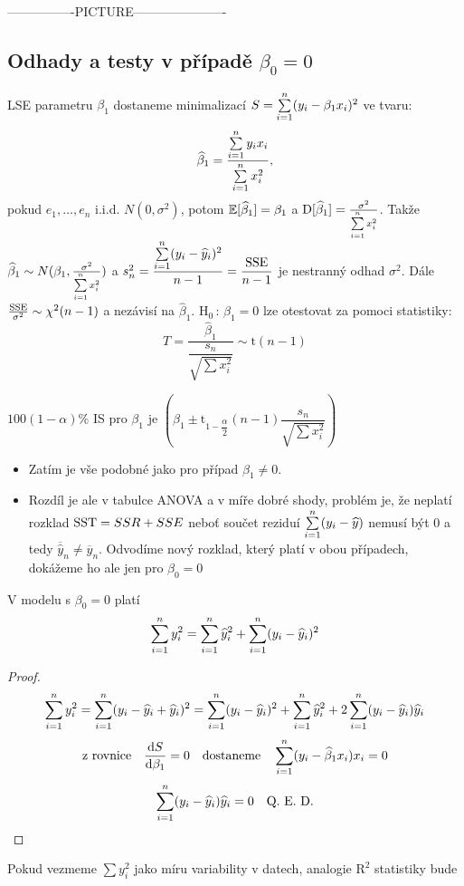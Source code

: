 ----------------PICTURE----------------------

\subsection{Odhady a testy v případě $ \beta_0 = 0 $}
LSE parametru $ \beta_1 $ dostaneme minimalizací $ S = \sum\limits_{i=1}^{n} ( y_i - \beta_1 x_i )^{2}  $ ve tvaru: 
$$ 
 \widehat{\beta}_{1} = \dfrac{\sum\limits_{i=1}^{n}  y_i  x_i }{\sum\limits_{i=1}^{n} x_i^{2}},
$$
pokud $ e_1,\dots , e_n  $ i.i.d. $ N(0,\sigma^{2}) $, potom $ \mathbb{E} [ \widehat{\beta}_{1} ] = \beta_1 $ a $ \mathrm{D} [ \widehat{\beta}_{1}  ] = \frac{\sigma^{2}}{\sum\limits_{i=1}^{n} x_i^{2}} $.
Takže $  \widehat{\beta}_{1} \sim N(\beta_1 , \frac{\sigma^{2}}{\sum\limits_{i=1}^{n} x_i^{2}}) $
a $ s_n^{2} = \dfrac{\sum\limits_{i=1}^{n} (y_i -  \widehat{y}_i)^{2}}{n-1} = \dfrac{\mathrm{SSE}}{n-1} $ je nestranný odhad $ \sigma^{2} $.
Dále $ \frac{\mathrm{SSE}}{\sigma^{2}} \sim \chi^{2}(n-1) $ a nezávisí na $ \widehat{\beta}_{1} $.
$ \text{H}_0 \, : \, \beta_1 = 0 $ lze otestovat za pomoci statistiky:
$$ 
  T = \dfrac{\widehat{\beta}_{1}}{\dfrac{s_n}{\sqrt{\sum x_i^{2}}}} \sim \text{t}(n-1)
$$

$ 100(1-\alpha) \% $ IS pro $ \beta_1 $ je $ (\widehat{\beta}_{1} \pm \text{t}_{1 - \dfrac{\alpha}{2}}(n-1)\dfrac{s_n}{\sqrt{\sum x_i^{2}}}) $
\begin{itemize}
  \item Zatím je vše podobné jako pro případ $ \beta_1 \neq 0 $.
  \item Rozdíl je ale v tabulce ANOVA a v míře dobré shody, problém je, že neplatí rozklad $ \mathrm{SST} = SSR + SSE $ neboť součet reziduí $ \sum\limits_{i=1}^{n} (y_i - \widehat{y}) $ nemusí být 0 a tedy $ \overline{\widehat{y}}_n \neq \overline{y}_n $.
  Odvodíme nový rozklad, který platí v obou případech, dokážeme ho ale jen pro $ \beta_0 = 0 $
\end{itemize}

\begin{theorem}
V modelu s $ \beta_0 = 0 $ platí
$$ 
 \sum\limits_{i=1}^{n} y_i^{2} = \sum\limits_{i=1}^{n} \widehat{y}_i^{2} + \sum\limits_{i=1}^{n} ( y_i - \widehat{y}_i )^{2}
$$
\end{theorem}

\begin{proof}
$$ 
 \sum\limits_{i=1}^{n} y_i^{2} = \sum\limits_{i=1}^{n} (y_i - \widehat{y}_i + \widehat{y}_i )^{2} = \sum\limits_{i=1}^{n} ( y_i - \widehat{y}_i )^{2} + \sum\limits_{i=1}^{n} \widehat{y}_i^{2} + 2 \sum\limits_{i=1}^{n} ( y_i - \widehat{y}_i ) \widehat{y}_i 
 $$
 $$
 \text{z rovnice}  \quad  \dfrac{\mathrm{d} S}{\mathrm{d} \beta_1} = 0  \quad  \text{dostaneme}  \quad \sum\limits_{i=1}^{n} ( y_i - \widehat{\beta}_1 x_i) x_i = 0
$$
 $$
 \sum\limits_{i=1}^{n} ( y_i - \widehat{y}_i ) \widehat{y}_i  = 0  \quad \text{Q. E. D.}
$$
\end{proof}
Pokud vezmeme $ \sum y_i^{2} $ jako míru variability v datech, analogie $ \text{R}^{2} $ statistiky bude

